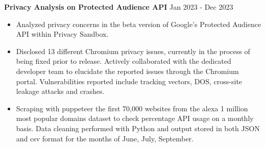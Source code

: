 
\noindent
\textbf{Privacy Analysis on Protected Audience API} \hfill Jan 2023 - Dec 2023
\begin{itemize}[noitemsep,topsep=0pt]
    \item Analyzed privacy concerns in the beta version of Google's Protected Audience API within Privacy Sandbox.
    \item Disclosed 13 different Chromium privacy issues, currently in the process of being fixed prior to release. Actively collaborated with the dedicated developer team to elucidate the reported issues through the Chromium portal.  Vulnerabilities reported include tracking vectors, DOS, cross-site leakage attacks and crashes.
    \item Scraping with puppeteer the first 70,000 websites from the alexa 1 million most popular domains dataset to check percentage API usage on a monthly basis. Data cleaning performed with Python and output stored in both JSON and csv format for the months of June, July, September.
\end{itemize}

